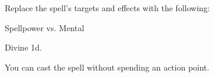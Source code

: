 Replace the spell's targets and effects with the following:
\begin{spellcontent}

\begin{augmenttargetinginfo}




\end{augmenttargetinginfo}


\begin{augmenteffects}




\begin{spellattack}{Spellpower vs. Mental}


\spellsuccess Divine  \minus1d.


\end{spellattack}



\end{augmenteffects}

\end{spellcontent}





You can cast the spell without spending an action point.




